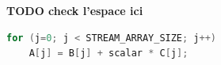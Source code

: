     \textbf{TODO check l'espace ici}
        
\begin{lstlisting}[language=c,caption={Fonction \textit{triad} extraite du benchmark \texttt{STREAM} \cite{McCalpin1995}.},label={lst:triadd}, 
  basicstyle=\footnotesize, frame=tb,
  xleftmargin=.065\textwidth, xrightmargin=.065\textwidth]
for (j=0; j < STREAM_ARRAY_SIZE; j++)
    A[j] = B[j] + scalar * C[j];
\end{lstlisting}






     
            


        
